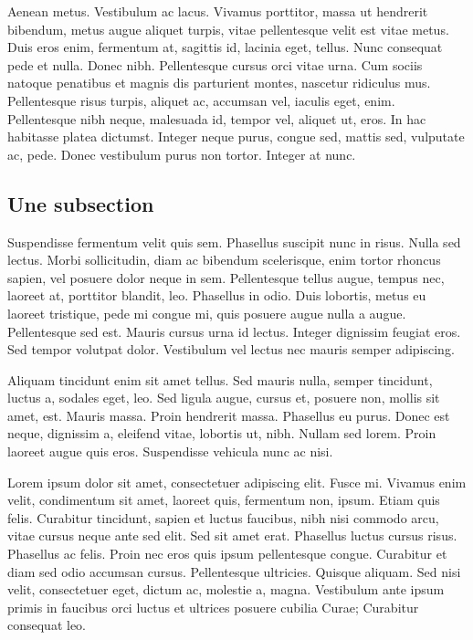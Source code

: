 \documentclass[../hdr.tex]{subfiles}
\begin{document}
Aenean metus. Vestibulum ac lacus. Vivamus porttitor, massa ut hendrerit
bibendum, metus augue aliquet turpis, vitae pellentesque velit est vitae metus.
Duis eros enim, fermentum at, sagittis id, lacinia eget, tellus. Nunc consequat
pede et nulla. Donec nibh. Pellentesque cursus orci vitae urna. Cum sociis
natoque penatibus et magnis dis parturient montes, nascetur ridiculus mus.
Pellentesque risus turpis, aliquet ac, accumsan vel, iaculis eget, enim.
Pellentesque nibh neque, malesuada id, tempor vel, aliquet ut, eros. In hac
habitasse platea dictumst. Integer neque purus, congue sed, mattis sed,
vulputate ac, pede. Donec vestibulum purus non tortor. Integer at nunc.

\subsection*{Une subsection}

Suspendisse fermentum velit quis sem. Phasellus suscipit nunc in risus. Nulla
sed lectus. Morbi sollicitudin, diam ac bibendum scelerisque, enim tortor
rhoncus sapien, vel posuere dolor neque in sem. Pellentesque tellus augue,
tempus nec, laoreet at, porttitor blandit, leo. Phasellus in odio. Duis
lobortis, metus eu laoreet tristique, pede mi congue mi, quis posuere augue
nulla a augue. Pellentesque sed est. Mauris cursus urna id lectus. Integer
dignissim feugiat eros. Sed tempor volutpat dolor. Vestibulum vel lectus nec
mauris semper adipiscing.

Aliquam tincidunt enim sit amet tellus. Sed mauris nulla, semper tincidunt,
luctus a, sodales eget, leo. Sed ligula augue, cursus et, posuere non, mollis
sit amet, est. Mauris massa. Proin hendrerit massa. Phasellus eu purus. Donec
est neque, dignissim a, eleifend vitae, lobortis ut, nibh. Nullam sed lorem.
Proin laoreet augue quis eros. Suspendisse vehicula nunc ac nisi.

Lorem ipsum dolor sit amet, consectetuer adipiscing elit. Fusce mi. Vivamus enim
velit, condimentum sit amet, laoreet quis, fermentum non, ipsum. Etiam quis
felis. Curabitur tincidunt, sapien et luctus faucibus, nibh nisi commodo arcu,
vitae cursus neque ante sed elit. Sed sit amet erat. Phasellus luctus cursus
risus. Phasellus ac felis. Proin nec eros quis ipsum pellentesque congue.
Curabitur et diam sed odio accumsan cursus. Pellentesque ultricies. Quisque
aliquam. Sed nisi velit, consectetuer eget, dictum ac, molestie a, magna.
Vestibulum ante ipsum primis in faucibus orci luctus et ultrices posuere cubilia
Curae; Curabitur consequat leo.
\end{document}
